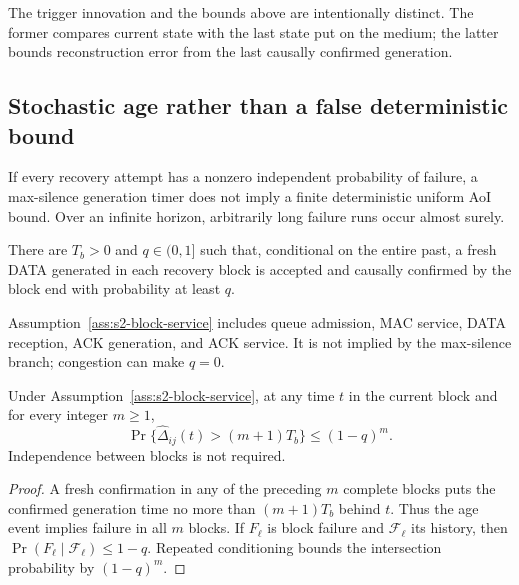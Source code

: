 The trigger innovation and the bounds above are intentionally distinct.  The
former compares current state with the last state put on the medium; the
latter bounds reconstruction error from the last causally confirmed
generation.

\subsection{Stochastic age rather than a false deterministic bound}

\begin{proposition}
If every recovery attempt has a nonzero independent probability of failure,
a max-silence generation timer does not imply a finite deterministic uniform
AoI bound.  Over an infinite horizon, arbitrarily long failure runs occur
almost surely.
\label{prop:s2-no-deterministic-age}
\end{proposition}

\begin{assumption}
There are $T_b>0$ and $q\in(0,1]$ such that, conditional on the entire past, a
fresh DATA generated in each recovery block is accepted and causally confirmed
by the block end with probability at least $q$.
\label{ass:s2-block-service}
\end{assumption}

Assumption~\ref{ass:s2-block-service} includes queue admission, MAC service,
DATA reception, ACK generation, and ACK service.  It is not implied by the
max-silence branch; congestion can make $q=0$.

\begin{theorem}
Under Assumption~\ref{ass:s2-block-service}, at any time $t$ in the current
block and for every integer $m\ge1$,
\begin{equation}
\Pr\{\widehat\Delta_{ij}(t)>(m+1)T_b\}\le(1-q)^m.
\label{eq:s2-age-tail}
\end{equation}
Independence between blocks is not required.
\label{thm:s2-age-tail}
\end{theorem}

\begin{proof}
A fresh confirmation in any of the preceding $m$ complete blocks puts the
confirmed generation time no more than $(m+1)T_b$ behind $t$.  Thus the age
event implies failure in all $m$ blocks.  If $F_\ell$ is block failure and
$\mathcal F_\ell$ its history, then
$\Pr(F_\ell\mid\mathcal F_\ell)\le1-q$.  Repeated conditioning bounds the
intersection probability by $(1-q)^m$.
\end{proof}

